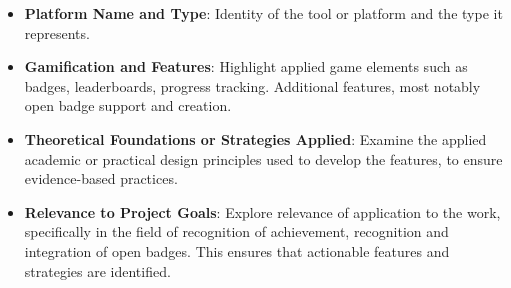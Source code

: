 \begin{itemize}
    \item \textbf{Platform Name and Type}:  Identity of the tool or platform and the type it represents.
    \item \textbf{Gamification and Features}:  Highlight applied game elements such as badges, leaderboards, progress tracking. Additional features, most notably open badge support and creation.
    \item \textbf{Theoretical Foundations or Strategies Applied}:  Examine the applied academic or practical design principles used to develop the features, to ensure evidence-based practices.
    \item \textbf{Relevance to Project Goals}: Explore relevance of application to the work, specifically in the field of recognition of achievement, recognition and integration of open badges. 
    This ensures that actionable features and strategies are identified.
\end{itemize}


